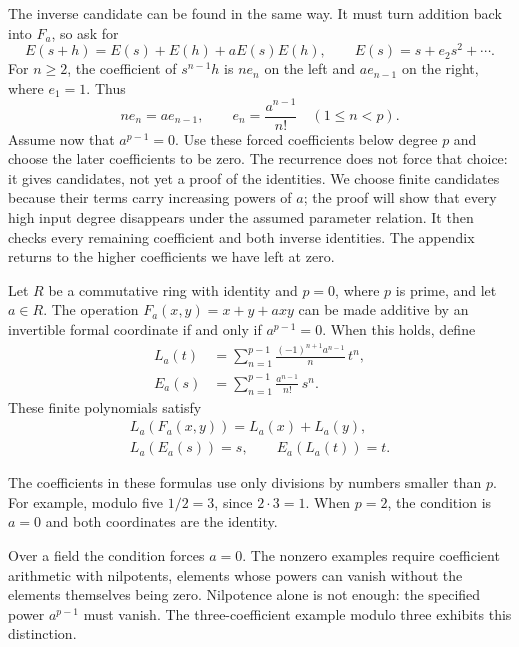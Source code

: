 The inverse candidate can be found in the same way. It must turn addition back into \(F_a\), so ask for
\[
 E(s+h)=E(s)+E(h)+aE(s)E(h),\qquad
 E(s)=s+e_2s^2+\cdots.
\]
For \(n\ge2\), the coefficient of \(s^{n-1}h\) is \(ne_n\) on the left and \(ae_{n-1}\) on the right, where \(e_1=1\). Thus
\[
 ne_n=ae_{n-1},\qquad e_n=\frac{a^{n-1}}{n!}\quad(1\le n<p).
\]
Assume now that \(a^{p-1}=0\). Use these forced coefficients below degree \(p\) and choose the later coefficients to be zero. The recurrence does not force that choice: it gives candidates, not yet a proof of the identities. We choose finite candidates because their terms carry increasing powers of \(a\); the proof will show that every high input degree disappears under the assumed parameter relation. It then checks every remaining coefficient and both inverse identities. The appendix returns to the higher coefficients we have left at zero.

\begin{theorem}\label{thm:family}
Let \(R\) be a commutative ring with identity and \(p=0\), where \(p\) is prime, and let \(a\in R\). The operation \(F_a(x,y)=x+y+a xy\) can be made additive by an invertible formal coordinate if and only if \(a^{p-1}=0\). When this holds, define
\begin{align}
 L_a(t)&=\sum_{n=1}^{p-1}\frac{(-1)^{n+1}a^{n-1}}n\,t^n,
 \label{eq:finite-log}\\
 E_a(s)&=\sum_{n=1}^{p-1}\frac{a^{n-1}}{n!}\,s^n.
 \label{eq:finite-exp}
\end{align}
These finite polynomials satisfy
\begin{gather}
 L_a(F_a(x,y))=L_a(x)+L_a(y),\label{eq:theorem-add}\\
 L_a(E_a(s))=s,\qquad E_a(L_a(t))=t.\label{eq:theorem-inverse}
\end{gather}
\end{theorem}

The coefficients in these formulas use only divisions by numbers smaller than \(p\). For example, modulo five \(1/2=3\), since \(2\cdot3=1\). When \(p=2\), the condition is \(a=0\) and both coordinates are the identity.

Over a field the condition forces \(a=0\). The nonzero examples require coefficient arithmetic with nilpotents, elements whose powers can vanish without the elements themselves being zero. Nilpotence alone is not enough: the specified power \(a^{p-1}\) must vanish. The three-coefficient example modulo three exhibits this distinction.


